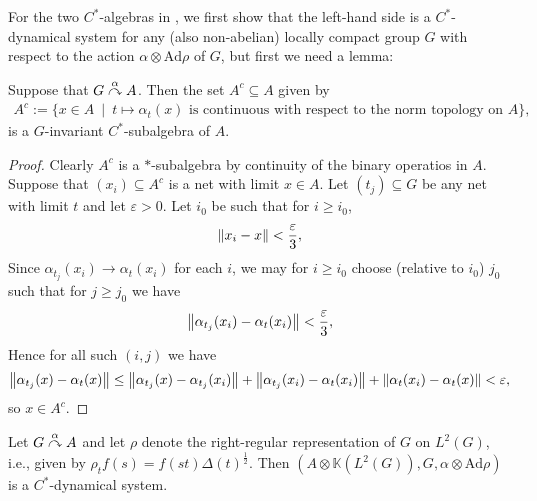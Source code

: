 For the two $C^*$-algebras in , we first show that the left-hand side is a $C^*$-dynamical system for any (also non-abelian) locally compact group $G$ with respect to the action $\alpha \otimes \mathrm{Ad} \rho$ of $G$, but first we need a lemma:
\begin{lemma}
	Suppose that $G \stackrel{\alpha}{\curvearrowright} A$. Then the set $A^c \subseteq A$ given by
	\begin{align*}
		A^c := \{x \in A \  \mid \ t \mapsto \alpha_t(x) \text{ is continuous with respect to the norm topology on }  A\},
	\end{align*}
	is a $G$-invariant $C^*$-subalgebra of $A$.
	\label{normfixAc}
\end{lemma}
\begin{proof}
	Clearly $A^c$ is a $*$-subalgebra by continuity of the binary operatios in $A$. Suppose that $(x_i) \subseteq A^c$ is a net with limit $x\in A$. Let $(t_j) \subseteq G$ be any net with limit $t$ and let $\varepsilon>0$. Let $i_0$ be such that for $i \geq i_0$,
	\begin{align*}
		\left\lVert x_i - x \right\rVert < \frac\varepsilon3,
	\end{align*}
	Since $\alpha_{t_j}(x_i) \to \alpha_{t}(x_i)$ for each $i$, we may for $i \geq i_0$ choose (relative to $i_0$) $j_0$ such that for $j \geq j_0$ we have
	\begin{align*}
		\left\lVert \alpha_{t_j}(x_i) - \alpha_t(x_i)\right\rVert < \frac\varepsilon3,
	\end{align*}
	Hence for all such $(i,j)$ we have
	\begin{align*}
		\left\lVert \alpha_{t_j}(x) - \alpha_{t}(x) \right\rVert \leq \left\lVert \alpha_{t_j}(x) - \alpha_{t_j}(x_i)\right\rVert + \left\lVert \alpha_{t_j}(x_i) - \alpha_t(x_i) \right\rVert + \left\lVert \alpha_t(x_i) - \alpha_t(x)\right\rVert < \varepsilon,	
	\end{align*}
	so $x \in A^c$.
\end{proof}
\begin{proposition}
Let $G \stackrel{\alpha}{\curvearrowright} A$ and let $\rho$ denote the right-regular representation of $G$ on $L^2(G)$, i.e., given by $\rho_t f(s) = f(st) \Delta(t)^{\frac12}$. Then $(A \otimes \mathbb{K}(L^2(G)), G, \alpha \otimes \mathrm{Ad} \rho)$ is a $C^*$-dynamical system.
\end{proposition}
